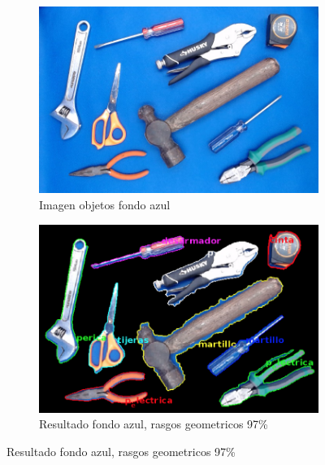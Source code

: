 \documentclass[a4paper, 11pt]{article}
\begin{document}
\begin{figure}[h]
  \centering
  \begin{subfigure}{0.5\linewidth}
    \includegraphics[width=\linewidth]{resultados_colores/todo_azul}
    \caption{Imagen objetos fondo azul}
    \label{fig:1a}
  \end{subfigure}\hfill
  \begin{subfigure}{0.5\linewidth}
    \includegraphics[width=\linewidth]{resultados_colores/resultado_azul_geom_0_97}
    \caption{Resultado fondo azul, rasgos geometricos 97\%}
    \label{fig:1a}
  \end{subfigure}
  

\end{figure}
\end{document}
